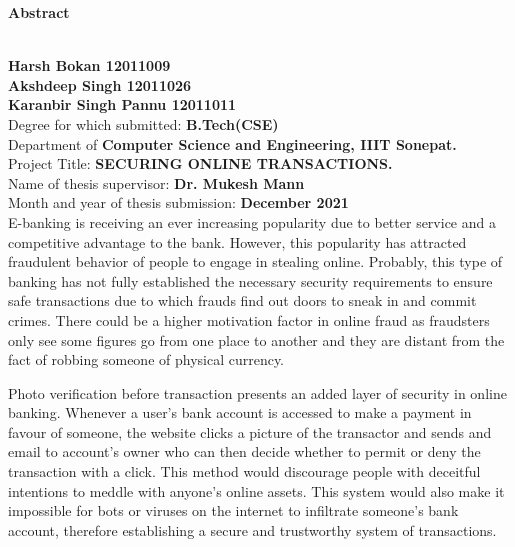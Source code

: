 \documentclass[12pt, oneside, a4paper]{article}
\begin{document}
\begin{center}
    \begin{Large}\textbf{Abstract}\end{Large}
\end{center}\\
\vspace{1cm}
\textbf{Harsh Bokan 12011009\\
Akshdeep Singh 12011026\\
Karanbir Singh Pannu 12011011}
\vspace{0.6cm}\\
Degree for which submitted: \textbf{B.Tech(CSE)}\vspace{0.2cm}\\
Department of \textbf{Computer Science and Engineering, IIIT Sonepat.}\vspace{0.2cm}\\
Project Title: \textbf{SECURING ONLINE TRANSACTIONS.}\vspace{0.2cm}\\
Name of thesis supervisor: \textbf{Dr. Mukesh Mann}\vspace{0.2cm}\\
Month and year of thesis submission: \textbf{December 2021}
\vspace{2cm}\\
E-banking is receiving an ever increasing popularity due to better service and a competitive advantage to the bank. However, this popularity has attracted fraudulent behavior of people to engage in stealing online. Probably, this type of banking has not fully established the necessary security requirements to ensure safe transactions due to which frauds find out doors to sneak in and commit crimes. There could be a higher motivation factor in online fraud as fraudsters only see some figures go from one place to another and they are distant from the fact of robbing someone of physical currency.

\vspace{0.5cm}
Photo verification before transaction presents an added layer of security in online banking. Whenever a user's bank account is accessed to make a payment in favour of someone, the website clicks a picture of the transactor and sends and email to account's owner who can then decide whether to permit or deny the transaction with a click. This method would discourage people with deceitful intentions to meddle with anyone's online assets. This system would also make it impossible for bots or viruses on the internet to infiltrate someone's bank account, therefore establishing a secure and trustworthy system of transactions.
\end{document}
